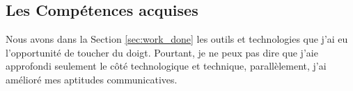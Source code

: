 \subsection{Les Compétences acquises}
Nous avons dans la Section \ref{sec:work_done} les outils et technologies que j'ai eu l'opportunité de toucher du doigt.
Pourtant, je ne peux pas dire que j'aie approfondi seulement le côté technologique et technique, parallèlement, j'ai amélioré mes aptitudes communicatives.
